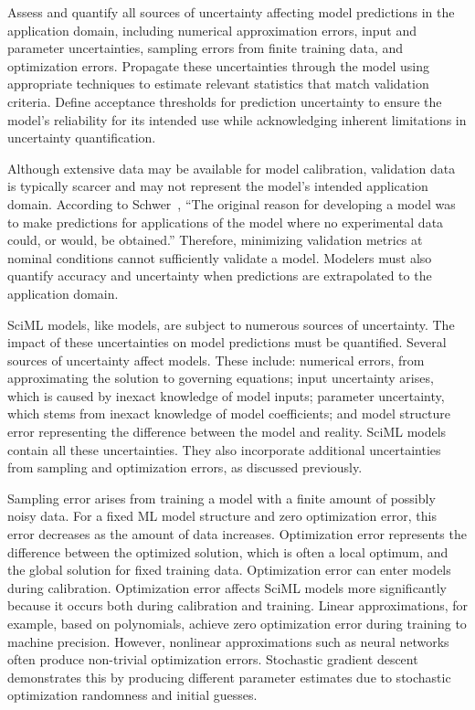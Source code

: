 \begin{essrec}
Assess and quantify all sources of uncertainty affecting model predictions in the application domain, including numerical approximation errors, input and parameter uncertainties, sampling errors from finite training data, and optimization errors. Propagate these uncertainties through the model using appropriate techniques to estimate relevant statistics that match validation criteria. Define acceptance thresholds for prediction uncertainty to ensure the model's reliability for its intended use while acknowledging inherent limitations in uncertainty quantification.
\end{essrec}

Although extensive data may be available for model calibration, validation data is typically scarcer and may not represent the model's intended application domain. According to Schwer~\cite{Schwer_EWC_2007}, ``The original reason for developing a model was to make predictions for applications of the model where no experimental data could, or would, be obtained.'' Therefore, minimizing validation metrics at nominal conditions cannot sufficiently validate a model. Modelers must also quantify accuracy and uncertainty when predictions are extrapolated to the application domain.

SciML models, like \CSE{} models, are subject to numerous sources of uncertainty. The impact of these uncertainties on model predictions must be quantified. Several sources of uncertainty affect \CSE{} models. These include: numerical errors, from approximating the solution to governing equations; input uncertainty arises, which is caused by inexact knowledge of model inputs; parameter uncertainty, which stems from inexact knowledge of model coefficients; and model structure error representing the difference between the model and reality. SciML models contain all these uncertainties. They also incorporate additional uncertainties from sampling and optimization errors, as discussed previously.

Sampling error arises from training a model with a finite amount of possibly noisy data. For a fixed ML model structure and zero optimization error, this error decreases as the amount of data increases. Optimization error represents the difference between the optimized solution, which is often a local optimum, and the global solution for fixed training data. Optimization error can enter \CSE{} models during calibration. Optimization error affects SciML models more significantly because it occurs both during calibration and training. Linear approximations, for example, based on polynomials, achieve zero optimization error during training to machine precision. However, nonlinear approximations such as neural networks often produce non-trivial optimization errors. Stochastic gradient descent demonstrates this by producing different parameter estimates due to stochastic optimization randomness and initial guesses.

